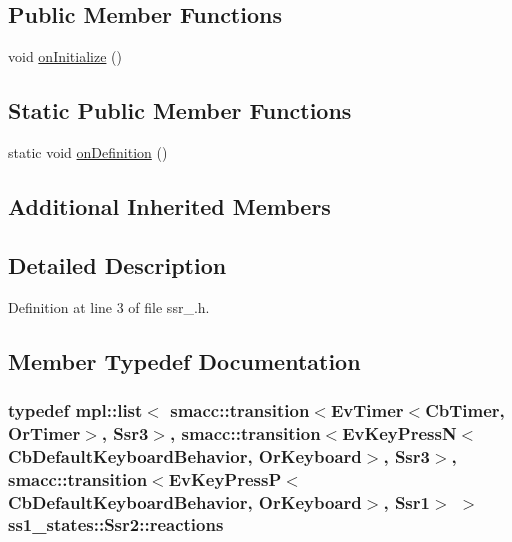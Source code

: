 \subsection*{Public Member Functions}
\begin{DoxyCompactItemize}
\item 
void \hyperlink{structss1__states_1_1Ssr2_a8c4908dcd56a2025a2a15837cc1c4cee}{on\+Initialize} ()
\end{DoxyCompactItemize}
\subsection*{Static Public Member Functions}
\begin{DoxyCompactItemize}
\item 
static void \hyperlink{structss1__states_1_1Ssr2_abd4e8f3a6861bec90b3b71120a03f560}{on\+Definition} ()
\end{DoxyCompactItemize}
\subsection*{Additional Inherited Members}


\subsection{Detailed Description}


Definition at line 3 of file ssr\+\_.\+h.



\subsection{Member Typedef Documentation}
\subsubsection[{\texorpdfstring{reactions}{reactions}}]{\setlength{\rightskip}{0pt plus 5cm}typedef mpl\+::list$<$ {\bf smacc\+::transition}$<$Ev\+Timer$<$Cb\+Timer, Or\+Timer$>$, {\bf Ssr3}$>$, {\bf smacc\+::transition}$<$Ev\+Key\+PressN$<$Cb\+Default\+Keyboard\+Behavior, Or\+Keyboard$>$, {\bf Ssr3}$>$, {\bf smacc\+::transition}$<$Ev\+Key\+PressP$<$Cb\+Default\+Keyboard\+Behavior, Or\+Keyboard$>$, {\bf Ssr1}$>$ $>$ {\bf ss1\+\_\+states\+::\+Ssr2\+::reactions}}\hypertarget{structss1__states_1_1Ssr2_ae46c66a6bee8f3532499185be4ce123b}{}\label{structss1__states_1_1Ssr2_ae46c66a6bee8f3532499185be4ce123b}


